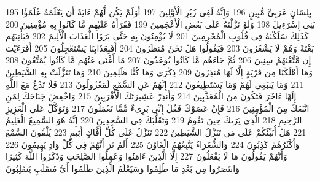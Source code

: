 \documentclass[20pt,a4paper]{article}
\begin{document}
{\tiny\colorbox{cl_aya}{195}} بِلِسَانٍ عَرَبِىٍّ مُّبِينٍ
{\tiny\colorbox{cl_aya}{196}} وَإِنَّهُ لَفِى زُبُرِ الْأَوَّلِينَ
{\tiny\colorbox{cl_aya}{197}} أَوَلَمْ يَكُن لَّهُمْ ءَايَةً أَن يَعْلَمَهُ عُلَمَؤُا بَنِى إِسْرَءِيلَ
{\tiny\colorbox{cl_aya}{198}} وَلَوْ نَزَّلْنَهُ عَلَى بَعْضِ الْأَعْجَمِينَ
{\tiny\colorbox{cl_aya}{199}} فَقَرَأَهُ عَلَيْهِم مَّا كَانُوا بِهِ مُؤْمِنِينَ
{\tiny\colorbox{cl_aya}{200}} كَذَلِكَ سَلَكْنَهُ فِى قُلُوبِ الْمُجْرِمِينَ
{\tiny\colorbox{cl_aya}{201}} لَا يُؤْمِنُونَ بِهِ حَتَّى يَرَوُا الْعَذَابَ الْأَلِيمَ
{\tiny\colorbox{cl_aya}{202}} فَيَأْتِيَهُم بَغْتَةً وَهُمْ لَا يَشْعُرُونَ
{\tiny\colorbox{cl_aya}{203}} فَيَقُولُوا هَلْ نَحْنُ مُنظَرُونَ
{\tiny\colorbox{cl_aya}{204}} أَفَبِعَذَابِنَا يَسْتَعْجِلُونَ
{\tiny\colorbox{cl_aya}{205}} أَفَرَءَيْتَ إِن مَّتَّعْنَهُمْ سِنِينَ
{\tiny\colorbox{cl_aya}{206}} ثُمَّ جَاءَهُم مَّا كَانُوا يُوعَدُونَ
{\tiny\colorbox{cl_aya}{207}} مَا أَغْنَى عَنْهُم مَّا كَانُوا يُمَتَّعُونَ
{\tiny\colorbox{cl_aya}{208}} وَمَا أَهْلَكْنَا مِن قَرْيَةٍ إِلَّا لَهَا مُنذِرُونَ
{\tiny\colorbox{cl_aya}{209}} ذِكْرَى وَمَا كُنَّا ظَلِمِينَ
{\tiny\colorbox{cl_aya}{210}} وَمَا تَنَزَّلَتْ بِهِ الشَّيَطِينُ
{\tiny\colorbox{cl_aya}{211}} وَمَا يَنبَغِى لَهُمْ وَمَا يَسْتَطِيعُونَ
{\tiny\colorbox{cl_aya}{212}} إِنَّهُمْ عَنِ السَّمْعِ لَمَعْزُولُونَ
{\tiny\colorbox{cl_aya}{213}} فَلَا تَدْعُ مَعَ اللَّهِ إِلَهًا ءَاخَرَ فَتَكُونَ مِنَ الْمُعَذَّبِينَ
{\tiny\colorbox{cl_aya}{214}} وَأَنذِرْ عَشِيرَتَكَ الْأَقْرَبِينَ
{\tiny\colorbox{cl_aya}{215}} وَاخْفِضْ جَنَاحَكَ لِمَنِ اتَّبَعَكَ مِنَ الْمُؤْمِنِينَ
{\tiny\colorbox{cl_aya}{216}} فَإِنْ عَصَوْكَ فَقُلْ إِنِّى بَرِىءٌ مِّمَّا تَعْمَلُونَ
{\tiny\colorbox{cl_aya}{217}} وَتَوَكَّلْ عَلَى الْعَزِيزِ الرَّحِيمِ
{\tiny\colorbox{cl_aya}{218}} الَّذِى يَرَىكَ حِينَ تَقُومُ
{\tiny\colorbox{cl_aya}{219}} وَتَقَلُّبَكَ فِى السَّجِدِينَ
{\tiny\colorbox{cl_aya}{220}} إِنَّهُ هُوَ السَّمِيعُ الْعَلِيمُ
{\tiny\colorbox{cl_aya}{221}} هَلْ أُنَبِّئُكُمْ عَلَى مَن تَنَزَّلُ الشَّيَطِينُ
{\tiny\colorbox{cl_aya}{222}} تَنَزَّلُ عَلَى كُلِّ أَفَّاكٍ أَثِيمٍ
{\tiny\colorbox{cl_aya}{223}} يُلْقُونَ السَّمْعَ وَأَكْثَرُهُمْ كَذِبُونَ
{\tiny\colorbox{cl_aya}{224}} وَالشُّعَرَاءُ يَتَّبِعُهُمُ الْغَاوُنَ
{\tiny\colorbox{cl_aya}{225}} أَلَمْ تَرَ أَنَّهُمْ فِى كُلِّ وَادٍ يَهِيمُونَ
{\tiny\colorbox{cl_aya}{226}} وَأَنَّهُمْ يَقُولُونَ مَا لَا يَفْعَلُونَ
{\tiny\colorbox{cl_aya}{227}} إِلَّا الَّذِينَ ءَامَنُوا وَعَمِلُوا الصَّلِحَتِ وَذَكَرُوا اللَّهَ كَثِيرًا وَانتَصَرُوا مِن بَعْدِ مَا ظُلِمُوا وَسَيَعْلَمُ الَّذِينَ ظَلَمُوا أَىَّ مُنقَلَبٍ يَنقَلِبُونَ
\end{document}
